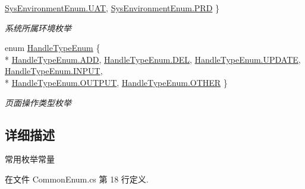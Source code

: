 \begin{DoxyCompactItemize}
\hyperlink{class_x_c_l_net_tools_1_1_enum_1_1_common_enum_a2dff7451b041ff407645f3b3d719e3e2a19dd6c1cec504ac854645f352eb03209}{Sys\-Environment\-Enum.\-U\-A\-T}, 
\hyperlink{class_x_c_l_net_tools_1_1_enum_1_1_common_enum_a2dff7451b041ff407645f3b3d719e3e2ae6902e951e9f7d122ca93383ded67ff3}{Sys\-Environment\-Enum.\-P\-R\-D}
 \}
\begin{DoxyCompactList}\small\item\em 系统所属环境枚举 \end{DoxyCompactList}\item 
enum \hyperlink{class_x_c_l_net_tools_1_1_enum_1_1_common_enum_af5501e481d93b082864bdcfb5fdb9596}{Handle\-Type\-Enum} \{ \\*
\hyperlink{class_x_c_l_net_tools_1_1_enum_1_1_common_enum_af5501e481d93b082864bdcfb5fdb9596a9eeb52badb613229884838847294b90d}{Handle\-Type\-Enum.\-A\-D\-D}, 
\hyperlink{class_x_c_l_net_tools_1_1_enum_1_1_common_enum_af5501e481d93b082864bdcfb5fdb9596a2bbe23c0e8b3f638f0f5aed4b6864513}{Handle\-Type\-Enum.\-D\-E\-L}, 
\hyperlink{class_x_c_l_net_tools_1_1_enum_1_1_common_enum_af5501e481d93b082864bdcfb5fdb9596a15a8022d0ed9cd9c2a2e756822703eb4}{Handle\-Type\-Enum.\-U\-P\-D\-A\-T\-E}, 
\hyperlink{class_x_c_l_net_tools_1_1_enum_1_1_common_enum_af5501e481d93b082864bdcfb5fdb9596aa84cc046d48610b05c21fd3670d0c829}{Handle\-Type\-Enum.\-I\-N\-P\-U\-T}, 
\\*
\hyperlink{class_x_c_l_net_tools_1_1_enum_1_1_common_enum_af5501e481d93b082864bdcfb5fdb9596a50a87f0d71f7221582dad4bf507a0f34}{Handle\-Type\-Enum.\-O\-U\-T\-P\-U\-T}, 
\hyperlink{class_x_c_l_net_tools_1_1_enum_1_1_common_enum_af5501e481d93b082864bdcfb5fdb9596a03570470bad94692ce93e32700d2e1cb}{Handle\-Type\-Enum.\-O\-T\-H\-E\-R}
 \}
\begin{DoxyCompactList}\small\item\em 页面操作类型枚举 \end{DoxyCompactList}\end{DoxyCompactItemize}


\subsection{详细描述}
常用枚举常量 



在文件 Common\-Enum.\-cs 第 18 行定义.



